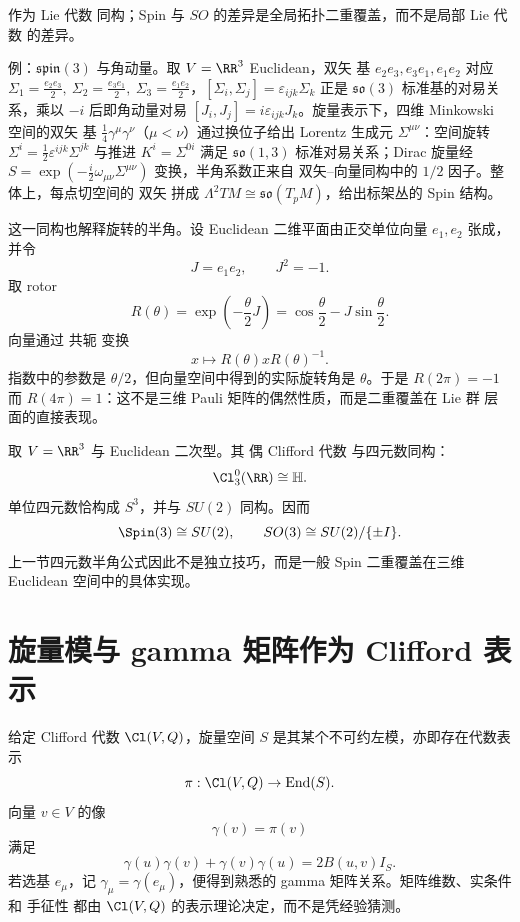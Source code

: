 作为 Lie 代数 同构；Spin 与 $SO$ 的差异是全局拓扑二重覆盖，而不是局部 Lie 代数 的差异。

例：$\mathfrak{spin}(3)$ 与角动量。取 $V=\RR^3$ Euclidean，双矢 基 $e_2e_3,e_3e_1,e_1e_2$ 对应 $\Sigma_1=\frac{e_2e_3}{2},\ \Sigma_2=\frac{e_3e_1}{2},\ \Sigma_3=\frac{e_1e_2}{2}$，$[\Sigma_i,\Sigma_j]=\varepsilon_{ijk}\Sigma_k$ 正是 $\mathfrak{so}(3)$ 标准基的对易关系，乘以 $-i$ 后即角动量对易 $[J_i,J_j]=i\varepsilon_{ijk}J_k$。旋量表示下，四维 Minkowski 空间的双矢 基 $\frac14\gamma^\mu\gamma^\nu$（$\mu<\nu$）通过换位子给出 Lorentz 生成元 $\Sigma^{\mu\nu}$：空间旋转 $\Sigma^i=\frac12\varepsilon^{ijk}\Sigma^{jk}$ 与推进 $K^i=\Sigma^{0i}$ 满足 $\mathfrak{so}(1,3)$ 标准对易关系；Dirac 旋量经 $S=\exp(-\frac{i}{2}\omega_{\mu\nu}\Sigma^{\mu\nu})$ 变换，半角系数正来自 双矢--向量同构中的 $1/2$ 因子。整体上，每点切空间的 双矢 拼成 $\Lambda^2TM\cong\mathfrak{so}(T_pM)$，给出标架丛的 Spin 结构。

这一同构也解释旋转的半角。设 Euclidean 二维平面由正交单位向量 $e_1,e_2$ 张成，并令
\[
J=e_1e_2,
\qquad J^2=-1.
\]
取 rotor
\begin{equation*}R(\theta)=\exp\!\left(-\frac{\theta}{2}J\right)
=\cos\frac\theta2-J\sin\frac\theta2.\end{equation*}
向量通过 共轭 变换
\[
x\longmapsto R(\theta)xR(\theta)^{-1}.
\]
指数中的参数是 $\theta/2$，但向量空间中得到的实际旋转角是 $\theta$。于是 $R(2\pi)=-1$ 而 $R(4\pi)=1$：这不是三维 Pauli 矩阵的偶然性质，而是二重覆盖在 Lie 群 层面的直接表现。

取 $V=\RR^3$ 与 Euclidean 二次型。其 偶 Clifford 代数 与四元数同构：
\[
\Cl^0_3(\RR)\cong\mathbb H.
\]
单位四元数恰构成 $S^3$，并与 $SU(2)$ 同构。因而
\[
\Spin(3)
\cong SU(2),
\qquad
SO(3)\cong SU(2)/\{\pm I\}.
\]
上一节四元数半角公式因此不是独立技巧，而是一般 Spin 二重覆盖在三维 Euclidean 空间中的具体实现。

\section{旋量模与 gamma 矩阵作为 Clifford 表示}
\label{sec:spinor-gamma}
给定 Clifford 代数 $\Cl(V,Q)$，旋量空间 $S$ 是其某个不可约左模，亦即存在代数表示
\[
\pi:\Cl(V,Q)\to\operatorname{End}(S).
\]
向量 $v\in V$ 的像
\[
\gamma(v)=\pi(v)
\]
满足
\begin{equation*}\gamma(u)\gamma(v)+\gamma(v)\gamma(u)
=2B(u,v)I_S.\end{equation*}
若选基 $e_\mu$，记 $\gamma_\mu=\gamma(e_\mu)$，便得到熟悉的 gamma 矩阵关系。矩阵维数、实条件和 手征性 都由 $\Cl(V,Q)$ 的表示理论决定，而不是凭经验猜测。


